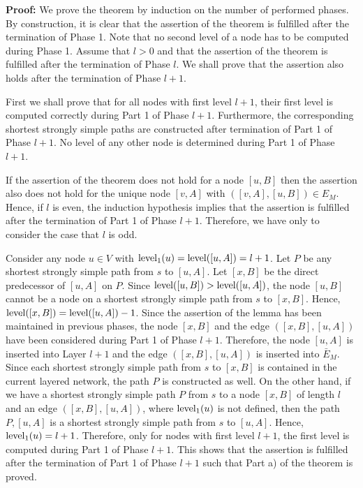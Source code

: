 \documentclass[12pt,twoside,a4paper]{article}
\def\lev{{\rm level}}
\begin{document}
\noindent
{\bf Proof:} 
We prove the theorem by induction on the number of performed phases. 
By construction, it is clear that the assertion of the theorem is fulfilled after the 
termination of Phase 1. Note that no second level of a node has to be computed during
Phase 1. Assume that $l > 0$ and that the assertion of the theorem is fulfilled after
the termination of Phase $l$. We shall prove that the assertion also holds
after the termination of Phase $l+1$.

First we shall prove that for all nodes with first level $l+1$, their first level is computed 
correctly during Part 1 of Phase $l+1$. Furthermore, the corresponding shortest strongly simple 
paths are constructed after termination of Part 1 of Phase $l+1$. No level of any other node
is determined during Part 1 of Phase $l+1$.

If the assertion of the theorem does not hold for a node $[u,B]$ then the assertion also
does not hold for the unique node $[v,A]$ with $([v,A],[u,B]) \in E_M$. Hence, if $l$ is
even, the induction hypothesis implies that the assertion is fulfilled after the termination
of Part 1 of Phase $l+1$. Therefore, we have only to consider the case that $l$ is odd.

Consider any node $u \in V$ with $\lev_1(u) = \lev([u,A]) = l+1$. Let $P$ be any shortest 
strongly simple path from $s$ to $[u,A]$. Let $[x,B]$ be the direct predecessor of $[u,A]$ 
on $P$. Since $\lev([u,B]) > \lev([u,A])$, the node $[u,B]$ cannot be a node on a shortest 
strongly simple path from $s$ to $[x,B]$. Hence, $\lev([x,B]) = \lev([u,A]) - 1$.
Since the assertion of the lemma has been maintained in previous phases, the node $[x,B]$
and the edge $([x,B],[u,A])$ have been considered during Part 1 of Phase $l+1$. Therefore,
the node $[u,A]$ is inserted into Layer $l+1$ and the edge $([x,B],[u,A])$ is inserted into 
$\bar{E}_M$. Since each shortest strongly simple path from $s$ to $[x,B]$ is contained in the 
current layered network, the path $P$ is constructed as well.
On the other hand, if we have a shortest strongly simple path $P$ from $s$ to a node $[x,B]$ 
of length $l$ and
an edge $([x,B],[u,A])$, where $\lev_1(u)$ is not defined, then the path $P,[u,A]$ is a shortest
strongly simple path from $s$ to $[u,A]$. Hence, $\lev_1(u) = l+1$. Therefore, only for nodes 
with first level $l+1$, the first level is computed during Part 1 of Phase $l+1$. 
This shows that the assertion is fulfilled after the termination of Part 1 of Phase $l+1$
such that Part a) of the theorem is proved.
\end{document}
